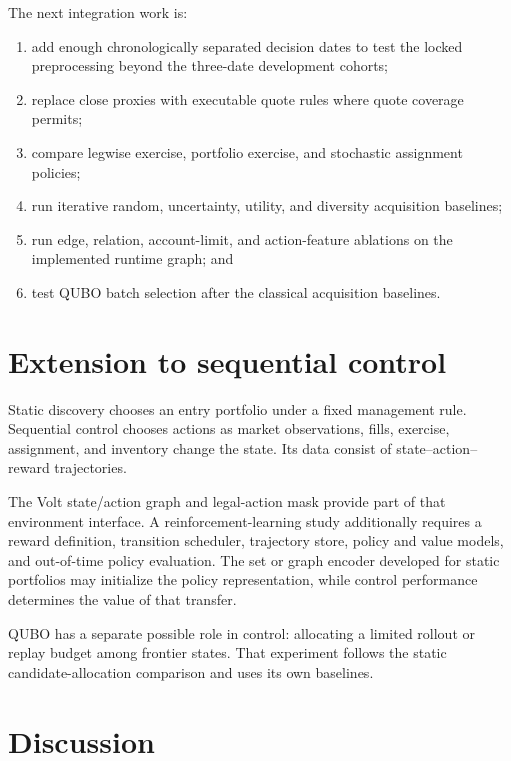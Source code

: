 \documentclass{strategynet-journal}
\newcommand{\VOLT}{\textsf{Volt}}
\begin{document}
\begin{SNcolumns}
The next integration work is:

\begin{enumerate}
  \item add enough chronologically separated decision dates to test the
        locked preprocessing beyond the three-date development cohorts;
  \item replace close proxies with executable quote rules where quote coverage
        permits;
  \item compare legwise exercise, portfolio exercise, and stochastic
        assignment policies;
  \item run iterative random, uncertainty, utility, and diversity acquisition
        baselines;
  \item run edge, relation, account-limit, and action-feature ablations on the
        implemented runtime graph; and
  \item test QUBO batch selection after the classical acquisition baselines.
\end{enumerate}

\section{Extension to sequential control}
\label{sec:control}

Static discovery chooses an entry portfolio under a fixed management rule.
Sequential control chooses actions as market observations, fills, exercise,
assignment, and inventory change the state.  Its data consist of
state--action--reward trajectories.

The \VOLT{} state/action graph and legal-action mask provide part of that
environment interface.  A reinforcement-learning study additionally requires a
reward definition, transition scheduler, trajectory store, policy and value
models, and out-of-time policy evaluation.  The set or graph encoder developed
for static portfolios may initialize the policy representation, while control
performance determines the value of that transfer.

QUBO has a separate possible role in control: allocating a limited rollout or
replay budget among frontier states.  That experiment follows the static
candidate-allocation comparison and uses its own baselines.

\section{Discussion}


\end{SNcolumns}
\end{document}
